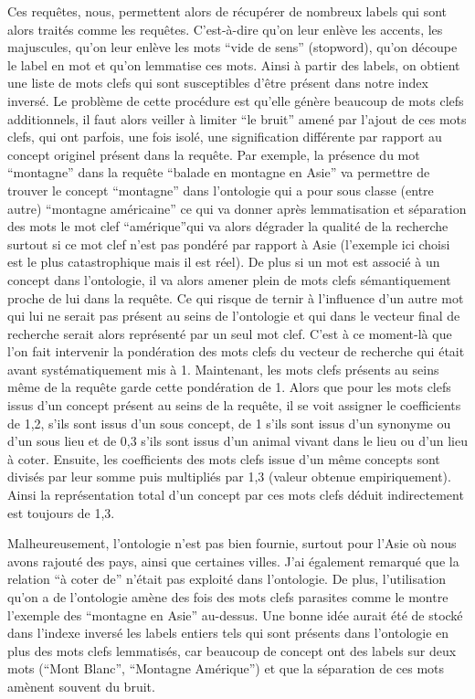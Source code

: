 \documentclass{article}
\begin{document}
Ces requêtes, nous, permettent alors de récupérer de nombreux labels qui sont alors
traités comme les requêtes. C’est-à-dire qu’on leur enlève les accents, les
majuscules, qu’on leur enlève les mots “vide de sens” (stopword), qu’on découpe le
label en mot et qu’on lemmatise ces mots. Ainsi à partir des labels, on obtient une
liste de mots clefs qui sont susceptibles d’être présent dans notre index inversé. Le
problème de cette procédure est qu’elle génère beaucoup de mots clefs additionnels,
il faut alors veiller à limiter “le bruit” amené par l’ajout de ces mots clefs, qui
ont parfois, une fois isolé, une signification différente par rapport au concept
originel présent dans la requête. Par exemple, la présence du mot “montagne” dans la
requête “balade en montagne en Asie” va permettre de trouver le concept “montagne”
dans l’ontologie qui a pour sous classe (entre autre) “montagne américaine” ce qui va
donner après lemmatisation et séparation des mots le mot clef “amérique”qui va alors
dégrader la qualité de la recherche surtout si ce mot clef n’est pas pondéré par
rapport à Asie (l’exemple ici choisi est le plus catastrophique mais il est réel). De
plus si un mot est associé à un concept dans l’ontologie, il va alors amener plein de
mots clefs sémantiquement proche de lui dans la requête. Ce qui risque de ternir
à l’influence d’un autre mot qui lui ne serait pas présent au seins de l’ontologie et
qui dans le vecteur final de recherche serait alors représenté par un seul mot clef.
C’est à ce moment-là que l’on fait intervenir la pondération des mots clefs du
vecteur de recherche qui était avant systématiquement mis à 1. Maintenant, les mots
clefs présents au seins même de la requête garde cette pondération de 1. Alors que
pour les mots clefs issus d’un concept présent au seins de la requête, il se voit
assigner le coefficients de 1,2, s’ils sont issus d’un sous concept, de 1 s’ils sont
issus d’un synonyme ou d’un sous lieu et de 0,3 s’ils sont issus d’un animal vivant
dans le lieu ou d’un lieu à coter. Ensuite, les coefficients des mots clefs issue
d’un même concepts sont divisés par leur somme puis multipliés par 1,3 (valeur
obtenue empiriquement). Ainsi la représentation total d’un concept par ces mots clefs
déduit indirectement est toujours de 1,3.

Malheureusement, l’ontologie n’est pas bien fournie, surtout pour l’Asie où nous
avons rajouté des pays, ainsi que certaines villes. J’ai également remarqué que la
relation “à coter de” n’était pas exploité dans l’ontologie. De plus, l’utilisation
qu’on a de l’ontologie amène des fois des mots clefs parasites comme le montre
l’exemple des “montagne en Asie” au-dessus. Une bonne idée aurait été de stocké dans
l’indexe inversé les labels entiers tels qui sont présents dans l’ontologie en plus
des mots clefs lemmatisés, car beaucoup de concept ont des labels sur deux mots
(“Mont Blanc”, “Montagne Amérique”) et que la séparation de ces mots amènent souvent
du bruit.
\end{document}
